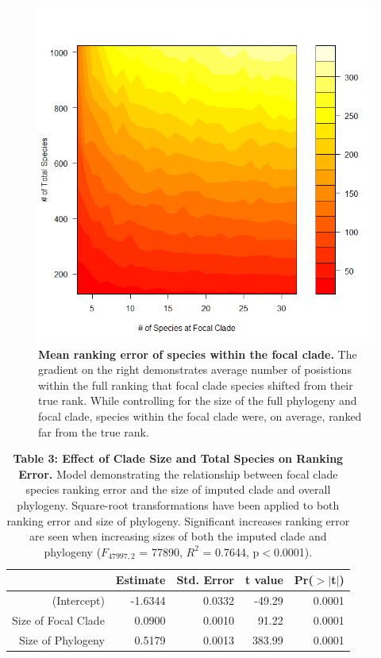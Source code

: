 \documentclass[12pt,english]{article}
\begin{document}
\begin{figure}[!ht]
  \center
  \includegraphics[width=.5\textwidth]{rankingError.png}
  \caption{\textbf{Mean ranking error of species within the focal clade.} The 
  gradient on the right demonstrates average number of posistions within the 
  full ranking that focal clade species shifted from their true rank.
  While controlling for the size of the full phylogeny and focal clade, species 
  within the focal clade were, on average, ranked far from the true rank. }
  \label{rankingError}
\end{figure}

\begin{table}[ht]
  \centering
  \begin{tabular}{rrrrr}
    \hline
   & Estimate & Std. Error & t value & Pr($>$$|$t$|$) \\
    \hline
  (Intercept) & -1.6344 & 0.0332 & -49.29 & 0.0001 \\
    Size of Focal Clade & 0.0900 & 0.0010 & 91.22 & 0.0001 \\
    Size of Phylogeny & 0.5179 & 0.0013 & 383.99 & 0.0001 \\
     \hline
     \hline
  \end{tabular}
  \caption*{\textbf{Table 3: Effect of Clade Size and Total Species on Ranking
  Error.} Model demonstrating the relationship between focal clade species
  ranking error and the size of imputed clade and overall phylogeny. Square-root
  transformations have been applied to both ranking error and size of phylogeny.
  Significant increases ranking error are seen when increasing sizes of both the
  imputed clade and phylogeny ($F_{47997, 2}$ = 77890, $R^{2}$ = 0.7644,
  p$<$0.0001).}
  \end{table}

\clearpage
\end{document}
